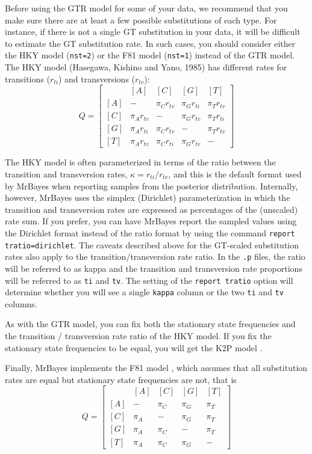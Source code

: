 \documentclass[12pt]{book}
\begin{document}
Before using the GTR model for some of your data, we recommend that you make sure there are at
least a few possible substitutions of each type. For instance, if there is not a single GT
substitution in your data, it will be difficult to estimate the GT substitution rate. In such
cases, you should consider either the HKY model (\texttt{nst=2}) or the F81 model (\texttt{nst=1})
instead of the GTR model. The HKY model (Hasegawa, Kishino and Yano, 1985) has different rates for
transitions ($r_{ti}$) and transversions ($r_{tv}$):
\[ Q=\begin{bmatrix} 
    & [A] & [C] & [G] & [T]\\
 [A]& - & \pi_C r_{tv} & \pi_G r_{ti} & \pi_T r_{tv}\\
 [C]& \pi_A r_{tv} & - & \pi_G r_{tv} & \pi_T r_{ti}\\
 [G]& \pi_A r_{ti} & \pi_C r_{tv} & - & \pi_T r_{tv}\\
 [T]& \pi_A r_{tv} & \pi_C r_{ti} & \pi_G r_{tv} & - 
\end{bmatrix}
\]

The HKY model is often parameterized in terms of the ratio between the transition and transversion
rates, $\kappa = r_{ti}/r_{tv}$, and this is the default format used by MrBayes when reporting
samples from the posterior distribution. Internally, however, MrBayes uses the simplex (Dirichlet)
parameterization in which the transition and transversion rates are expressed as percentages of the
(unscaled) rate sum. If you prefer, you can have MrBayes report the sampled values using the
Dirichlet format instead of the ratio format by using the command \texttt{report tratio=dirichlet}.
The caveats described above for the GT-scaled substitution rates also apply to the
transition/transversion rate ratio. In the \texttt{.p} files, the ratio will be referred to as
kappa and the transition and transversion rate proportions will be referred to as \texttt{ti} and
\texttt{tv}. The setting of the \texttt{report tratio} option will determine whether you will see
a single \texttt{kappa} column or the two \texttt{ti} and \texttt{tv} columns.

As with the GTR model, you can fix both the stationary state frequencies and the transition /
transversion rate ratio of the HKY model. If you fix the stationary state frequencies to be equal,
you will get the K2P model \citep{kimura80}.

Finally, MrBayes implements the F81 model \citep{felsenstein81}, which assumes that all
substitution rates are equal but stationary state frequencies are not, that is
\[
Q=\begin{bmatrix}
    & [A] & [C] & [G] & [T] \\
 [A]& - & \pi_C & \pi_G & \pi_T\\
 [C]& \pi_A & - & \pi_G &\pi_T \\
 [G]& \pi_A & \pi_C& - & \pi_T\\
 [T]& \pi_A & \pi_C&\pi_G  & -
\end{bmatrix}
\]
\end{document}
